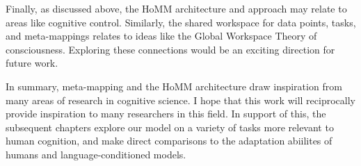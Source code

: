Finally, as discussed above, the HoMM architecture and approach may relate to areas like cognitive control. Similarly, the shared workspace for data points, tasks, and meta-mappings relates to ideas like the Global Workspace Theory of consciousness. Exploring these connections would be an exciting direction for future work. 

In summary, meta-mapping and the HoMM architecture draw inspiration from many areas of research in cognitive science. I hope that this work will reciprocally provide inspiration to many researchers in this field. In support of this, the subsequent chapters explore our model on a variety of tasks more relevant to human cognition, and make direct comparisons to the adaptation abiilites of humans and language-conditioned models. 

